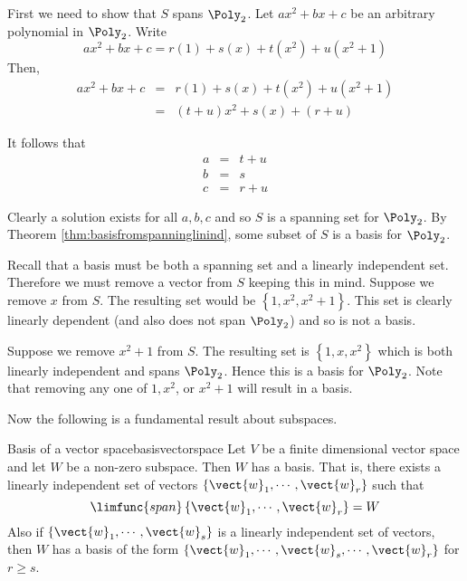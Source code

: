 \begin{solution}
First we need to show that $S$ spans $\Poly_2$. Let $ax^2 + bx + c$ be an arbitrary polynomial in $\Poly_2$. Write 
\[
ax^2 + bx + c = r(1) + s(x) + t(x^2) + u (x^2 + 1)
\]
Then,
\begin{eqnarray*}
ax^2 +bx + c &=& r(1) + s(x) + t(x^2) + u (x^2 + 1) \\
&=& (t+u) x^2 + s(x) + (r+u) 
\end{eqnarray*}

It follows that 
\begin{eqnarray*}
a &=& t + u \\
b &=& s \\
c &=& r + u 
\end{eqnarray*}

Clearly a solution exists for all $a,b,c$ and so $S$ is a spanning set for $\Poly_2$. By Theorem \ref{thm:basisfromspanninglinind}, some subset of $S$ is a basis for $\Poly_2$. 

Recall that a basis must be both a spanning set and a linearly independent set.
Therefore we must remove a vector from $S$ keeping this in mind. Suppose we remove $x$ from $S$. The resulting set would be $\left\{ 1, x^2, x^2 + 1 \right\}$. This set is clearly linearly dependent (and also does not span $\Poly_2$) and so is not a basis. 

Suppose we remove $x^2 + 1$ from $S$. The resulting set is $\left\{ 1, x, x^2 \right\}$ which is both linearly independent and spans $\Poly_2$. Hence this is a basis for $\Poly_2$. Note that removing any one of $1, x^2$, or $x^2 + 1$ will result in a basis.
\end{solution}

Now the following is a fundamental result about subspaces.

\begin{theorem}{Basis of a vector space}{basisvectorspace}
Let $V$ be a finite dimensional vector space and let $W$ be
a non-zero subspace. Then $W$ has a basis. That is, there exists a linearly
independent set of vectors $\left\{ \vect{w}_{1},\cdots ,\vect{w}_{r}\right\} $
such that 
\begin{equation*}
\limfunc{span}\left\{ \vect{w}_{1},\cdots ,\vect{w}_{r}\right\} =W
\end{equation*}
Also if $\left\{ \vect{w}_{1},\cdots ,\vect{w}_{s}\right\} $ is a linearly
independent set of vectors, then $W$ has a basis of the form $\left\{ \vect{w}
_{1},\cdots ,\vect{w}_{s},\cdots ,\vect{w}_{r}\right\} $ for $r\geq s$.
\end{theorem}

